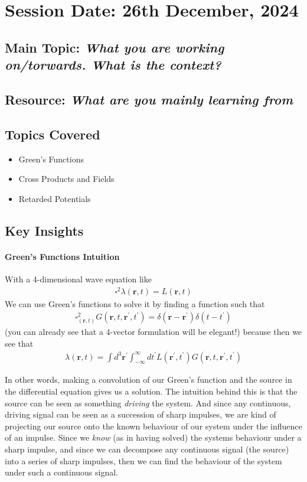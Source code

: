 \section{Session Date: 26th December, 2024}
\subsection*{Main Topic: \textit{What you are working on/torwards. What is the context?}}
\subsection*{Resource: \textit{What are you mainly learning from}}
\subsection*{Topics Covered}
\begin{itemize}
    \item Green's Functions
    \item Cross Products and Fields
    \item Retarded Potentials
\end{itemize}

\subsection*{Key Insights}
\paragraph{Green's Functions Intuition}
With a 4-dimensional wave equation like
\begin{align*}
    \square ^{2} \lambda(\mathbf{r}, t) = L(\mathbf{r}, t)
\end{align*}
We can use Green's functions to solve it by finding a function such that
\begin{align*}
    \square_{(\mathbf{r}, t)}^{2} G(\mathbf{r}, t, \mathbf{r}^{\prime}, t^{\prime} ) = \delta (\mathbf{r} - \mathbf{r}^{\prime} )\delta (t - t^{\prime} )
\end{align*}
(you can already see that a 4-vector formulation will be elegant!) because then we see that \begin{align*}
    \lambda (\mathbf{r}, t) = \int d^3 \mathbf{r}^{\prime}  \int_{-\infty}^{\infty} dt^{\prime} L(\mathbf{r}^{\prime} , t^{\prime} ) G(\mathbf{r}, t, \mathbf{r}^{\prime}, t^{\prime} )  
\end{align*}

In other words, making a convolution of our Green's function and the source in the differential equation gives us a solution. The intuition behind this is that the source can be seen as something \textit{driving} the system. And since any continuous, driving signal can be seen as a succession of sharp impulses, we are kind of projecting our source onto the known behaviour of our system under the influence of an impulse. Since we \textit{know} (as in having solved) the systems behaviour under a sharp impulse, and since we can decompose any continuous signal (the source) into a series of sharp impulses, then we can find the behaviour of the system under such a continuous signal. 

